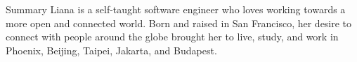 \documentclass{resume} %
\begin{document}

\begin{rSection}{Summary}
Liana is a self-taught software engineer who loves working towards a more open and connected world. Born and raised in San Francisco, her desire to connect with people around the globe brought her to live, study, and work in Phoenix, Beijing, Taipei, Jakarta, and Budapest.

\end{rSection}

\end{document}
